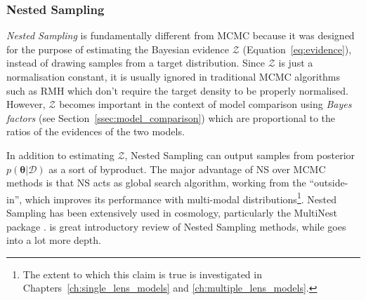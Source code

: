 \documentclass[12pt,dvipsnames]{report}
\newcommand{\ssf}[1]{\textsf{#1}}
\renewcommand{\vec}[1]{\boldsymbol{\mathbf{#1}}}
\begin{document}
\subsubsection{Nested Sampling}
\label{sssec:ns}
\emph{Nested Sampling} \citep{2004AIPC..735..395S}  is fundamentally different 
from MCMC because it was designed for the purpose  of estimating the
Bayesian evidence  $\mathcal{Z}$ (Equation~\ref{eq:evidence}), instead of drawing samples 
from  a target distribution.
Since $\mathcal{Z}$ is just a normalisation constant, it is usually ignored 
in traditional MCMC algorithms such as RMH which don't require the target 
density to be properly normalised.
However, $\mathcal{Z}$  becomes important in the context of model comparison 
using \emph{Bayes factors} (see Section~\ref{ssec:model_comparison}) which
are proportional to the ratios of the evidences of the two models. 

In addition to estimating $\mathcal{Z}$, Nested Sampling can output samples 
from posterior $p(\vec\theta\lvert \mathcal{D})$ as a sort of byproduct. 
The major advantage of NS over MCMC methods is that NS acts as 
global search algorithm, working from the ``outside-in'', which improves its 
performance with multi-modal distributions\footnote{
    The extent to which this claim is true is investigated in 
    Chapters~\ref{ch:single_lens_models} and \ref{ch:multiple_lens_models}.
}. Nested Sampling has been extensively used in cosmology, 
particularly the \ssf{MultiNest} package \citep{arXiv:0809.3437}. 
\citet{arXiv:2205.15570} is great introductory review of Nested Sampling methods, while 
\citet{arXiv:2101.09675} goes into a lot more depth.
\end{document}

